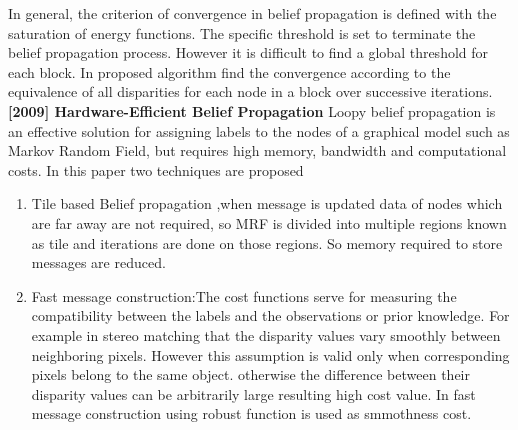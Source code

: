 In general, the criterion of convergence in belief propagation is defined with the saturation of energy functions. The specific threshold is set to terminate the belief propagation process. However it is difficult to find a global threshold for each block. In proposed algorithm find the convergence according to the equivalence of all disparities for each node in a block over successive iterations.\newline
\textbf{[2009]  Hardware-Efficient Belief Propagation}\cite{r4}\newline
Loopy belief propagation is an effective solution for assigning labels to the nodes of a graphical model such as Markov Random Field, but requires high memory, bandwidth and computational costs.
In this paper two techniques are proposed
\begin{enumerate}
  \item Tile based Belief propagation ,when message is updated data of nodes which are far away are not required, so MRF is divided into
multiple regions known as tile and iterations are done on those regions. So memory required to store messages are reduced.
\item Fast message construction:The cost functions serve for measuring the compatibility between the labels and the observations or prior knowledge.
For example in stereo matching that the disparity values vary smoothly between neighboring pixels. However this assumption is valid only when corresponding pixels belong to the same object. otherwise the difference between their disparity values can be arbitrarily large resulting high cost value. In fast message construction using robust function is used as smmothness cost.

\end{enumerate}
















%
%
%







